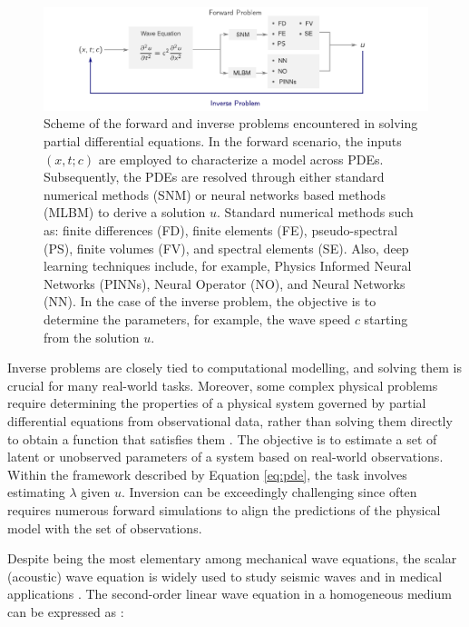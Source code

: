 \documentclass[11pt,twoside]{article}
\begin{document}
\begin{figure}[h]
\includegraphics{figs/forward_inverse_modeling_waves.pdf}
    \caption{Scheme of the forward and inverse problems encountered in solving partial differential equations. In the forward 
    scenario, the inputs $(x,t;c)$ are employed to characterize a model across PDEs. Subsequently, the PDEs are resolved through 
    either standard numerical methods (SNM) or neural networks based methods (MLBM) to derive a solution $u$. Standard numerical 
    methods such as: finite differences (FD), finite elements (FE), pseudo-spectral (PS), finite volumes (FV), and spectral 
    elements (SE). Also, deep learning techniques include, for example, Physics Informed Neural Networks (PINNs), Neural Operator 
    (NO), and Neural Networks (NN). In the case of the inverse problem, the objective is to determine the parameters, for example, 
    the wave speed $c$ starting from the solution $u$.}
    \label{fig:forward_inverse}
\end{figure}

Inverse problems are closely tied to computational modelling, and solving them is crucial for many real-world tasks. 
Moreover, some complex physical problems require determining the properties of a physical system governed by partial 
differential equations from observational data, rather than solving them directly to obtain a function that satisfies them 
\citep{galiounas_battery_2022, ren_seismicnet_2024,mccann_convolutional_2017}. The objective is to estimate a set of latent or 
unobserved parameters of a system based on real-world observations. Within the framework described by Equation \ref{eq:pde}, 
the task involves estimating $\lambda$ given $u$. Inversion can be exceedingly challenging since often requires numerous forward 
simulations to align the predictions of the physical model with the set of observations. 

Despite being the most elementary among mechanical wave equations, the scalar (acoustic) wave equation is widely used to study 
seismic waves and in medical applications \citep{moseley_physics-informed_2022, alkhadhr_wave_2023}. The second-order linear 
wave equation in a homogeneous medium can be expressed as \citep{Carcione2002}:
\end{document}

